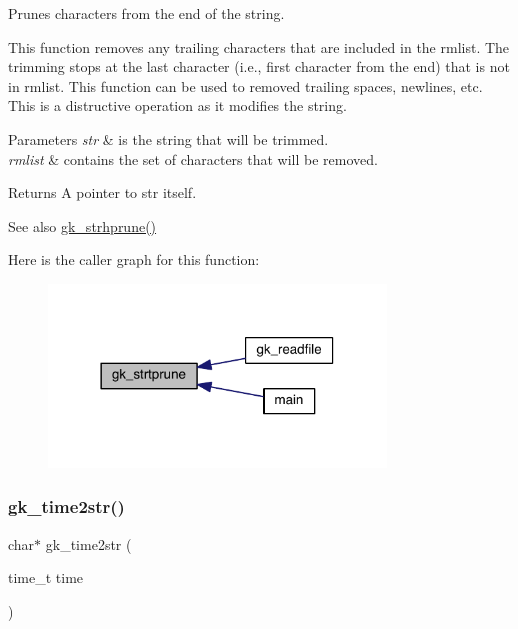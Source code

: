 Prunes characters from the end of the string. 

This function removes any trailing characters that are included in the {\ttfamily rmlist}. The trimming stops at the last character (i.\+e., first character from the end) that is not in {\ttfamily rmlist}. This function can be used to removed trailing spaces, newlines, etc. This is a distructive operation as it modifies the string.


\begin{DoxyParams}{Parameters}
{\em str} & is the string that will be trimmed. \\
\hline
{\em rmlist} & contains the set of characters that will be removed. \\
\hline
\end{DoxyParams}
\begin{DoxyReturn}{Returns}
A pointer to {\ttfamily str} itself. 
\end{DoxyReturn}
\begin{DoxySeeAlso}{See also}
\hyperlink{a00143_adf6c1dfa83b68cea7f048086e0a585c0}{gk\+\_\+strhprune()} 
\end{DoxySeeAlso}
Here is the caller graph for this function\+:\nopagebreak
\begin{figure}[H]
\begin{center}
\leavevmode
\includegraphics[width=254pt]{a00143_a05261ee12d082a78cabc018d2f5e2266_icgraph}
\end{center}
\end{figure}
\mbox{\label{a00143_a79ca4ee9f715e6ce364af43f7f7a6cfc}} 
\subsubsection{\texorpdfstring{gk\+\_\+time2str()}{gk\_time2str()}}
{\footnotesize\ttfamily char$\ast$ gk\+\_\+time2str (\begin{DoxyParamCaption}\item[{time\+\_\+t}]{time }\end{DoxyParamCaption})}



